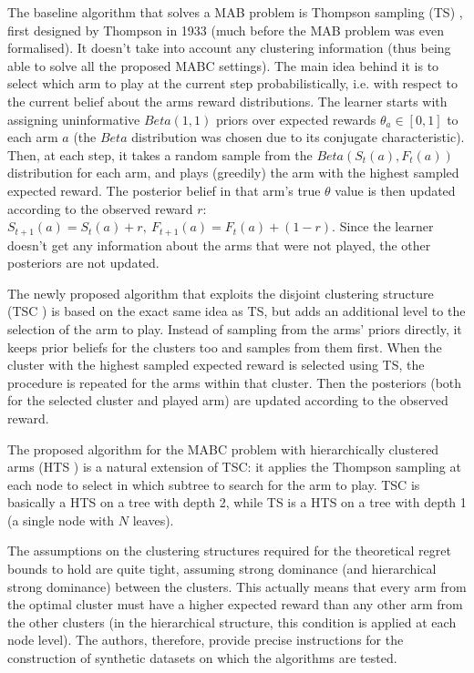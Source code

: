 The baseline algorithm that solves a MAB problem is Thompson sampling (TS) \cite{thompson}, first designed by Thompson in 1933 (much before the MAB problem was even formalised). It doesn't take into account any clustering information (thus being able to solve all the proposed MABC settings). The main idea behind it is to select which arm to play at the current step probabilistically, i.e. with respect to the current belief about the arms reward distributions. The learner starts with assigning uninformative $Beta(1, 1)$ priors over expected rewards $\theta_a \in [0, 1]$ to each arm $a$ (the $Beta$ distribution was chosen due to its conjugate characteristic). Then, at each step, it takes a random sample from the $Beta(S_t(a), F_t(a))$ distribution for each arm, and plays (greedily) the arm with the highest sampled expected reward. The posterior belief in that arm's true $\theta$ value is then updated according to the observed reward $r$: $S_{t+1}(a) = S_t(a) + r,\ F_{t+1}(a) = F_t(a) + (1 - r)$. Since the learner doesn't get any information about the arms that were not played, the other posteriors are not updated.

The newly proposed algorithm that exploits the disjoint clustering structure (TSC \cite{bandits}) is based on the exact same idea as TS, but adds an additional level to the selection of the arm to play. Instead of sampling from the arms' priors directly, it keeps prior beliefs for the clusters too and samples from them first. When the cluster with the highest sampled expected reward is selected using TS, the procedure is repeated for the arms within that cluster. Then the posteriors (both for the selected cluster and played arm) are updated according to the observed reward. 

The proposed algorithm for the MABC problem with hierarchically clustered arms (HTS \cite{bandits}) is a natural extension of TSC: it applies the Thompson sampling at each node to select in which subtree to search for the arm to play. TSC is basically a HTS on a tree with depth 2, while TS is a HTS on a tree with depth 1 (a single node with $N$ leaves).

The assumptions on the clustering structures required for the theoretical regret bounds to hold are quite tight, assuming strong dominance (and hierarchical strong dominance) between the clusters. This actually means that every arm from the optimal cluster must have a higher expected reward than any other arm from the other clusters (in the hierarchical structure, this condition is applied at each node level). The authors, therefore, provide precise instructions for the construction of synthetic datasets on which the algorithms are tested.

